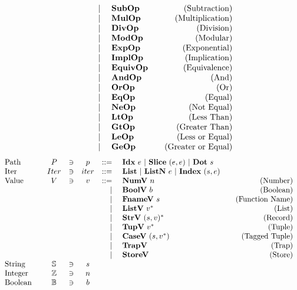\begin{align*}
\begin{array}{lcccrlr}
    &&&& | & ~ \textbf{SubOp} &\quad\text{(Subtraction)} \\
    &&&& | & ~ \textbf{MulOp} &\quad\text{(Multiplication)} \\
    &&&& | & ~ \textbf{DivOp} &\quad\text{(Division)} \\
    &&&& | & ~ \textbf{ModOp} &\quad\text{(Modular)} \\
    &&&& | & ~ \textbf{ExpOp} &\quad\text{(Exponential)} \\
    &&&& | & ~ \textbf{ImplOp} &\quad\text{(Implication)} \\
    &&&& | & ~ \textbf{EquivOp} &\quad\text{(Equivalence)} \\
    &&&& | & ~ \textbf{AndOp} &\quad\text{(And)} \\
    &&&& | & ~ \textbf{OrOp} &\quad\text{(Or)} \\
    &&&& | & ~ \textbf{EqOp} &\quad\text{(Equal)} \\
    &&&& | & ~ \textbf{NeOp} &\quad\text{(Not Equal)} \\
    &&&& | & ~ \textbf{LtOp} &\quad\text{(Less Than)} \\
    &&&& | & ~ \textbf{GtOp} &\quad\text{(Greater Than)} \\
    &&&& | & ~ \textbf{LeOp} &\quad\text{(Less or Equal)} \\
    &&&& | & ~ \textbf{GeOp} &\quad\text{(Greater or Equal)} \\
\end{array}
\end{align*}
\newpage
\begin{align*}
\begin{array}{lcccrlr}
%
  \text{Path}\quad& P &\ni& p &::=& ~ \idxp ~ e ~ | ~ \slicep ~ (e, e) ~ | ~ \dotp ~ s \\
%
  \text{Iter}\quad& Iter &\ni& iter &::=& ~ \listiter ~ | ~ \listniter ~ e ~|~ \listidxiter ~ (s, e) \\
%
  \text{Value}\quad& V &\ni& v &::=& ~ \numv ~ n &\quad\text{(Number)} \\
    &&&& | & ~ \boolv ~ b &\quad\text{(Boolean)} \\
    &&&& | & ~ \fnamev ~ s &\quad\text{(Function Name)} \\
    &&&& | & ~ \listv ~ \seq v &\quad\text{(List)} \\
    &&&& | & ~ \strv ~ \seq{(s, v)} &\quad\text{(Record)} \\
    &&&& | & ~ \tupv ~ \seq v &\quad\text{(Tuple)} \\
    &&&& | & ~ \casev ~ (s, \seq v) &\quad\text{(Tagged Tuple)} \\
    &&&& | & ~ \trapv &\quad\text{(Trap)} \\
    &&&& | & ~ \storev &\quad\text{(Store)} \\
  \text{String}\quad& \mathbb S &\ni& s \\
  \text{Integer}\quad& \mathbb Z &\ni& n \\
  \text{Boolean}\quad& \mathbb B &\ni& b \\
\end{array}
\end{align*}

